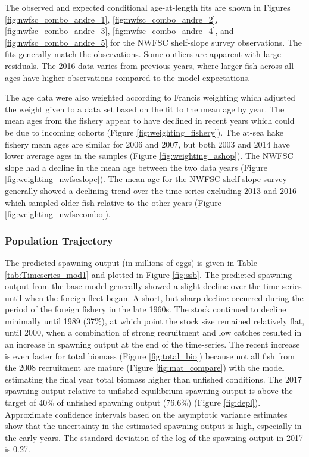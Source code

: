 \documentclass[12pt,]{article}
\begin{document}
The observed and expected conditional age-at-length fits are shown in
Figures \ref{fig:nwfsc_combo_andre_1}, \ref{fig:nwfsc_combo_andre_2},
\ref{fig:nwfsc_combo_andre_3}, \ref{fig:nwfsc_combo_andre_4}, and
\ref{fig:nwfsc_combo_andre_5} for the NWFSC shelf-slope survey
observations. The fits generally match the observations. Some outliers
are apparent with large residuals. The 2016 data varies from previous
years, where larger fish across all ages have higher observations
compared to the model expectations.

The age data were also weighted according to Francis weighting which
adjusted the weight given to a data set based on the fit to the mean age
by year. The mean ages from the fishery appear to have declined in
recent years which could be due to incoming cohorts (Figure
\ref{fig:weighting_fishery}). The at-sea hake fishery mean ages are
similar for 2006 and 2007, but both 2003 and 2014 have lower average
ages in the samples (Figure \ref{fig:weighting_ashop}). The NWFSC slope
had a decline in the mean age between the two data years (Figure
\ref{fig:weighting_nwfscslope}). The mean age for the NWFSC shelf-slope
survey generally showed a declining trend over the time-series excluding
2013 and 2016 which sampled older fish relative to the other years
(Figure \ref{fig:weighting_nwfsccombo}).

\subsubsection{Population Trajectory}\label{population-trajectory}

The predicted spawning output (in millions of eggs) is given in Table
\ref{tab:Timeseries_mod1} and plotted in Figure \ref{fig:ssb}. The
predicted spawning output from the base model generally showed a slight
decline over the time-series until when the foreign fleet began. A
short, but sharp decline occurred during the period of the foreign
fishery in the late 1960s. The stock continued to decline minimally
until 1989 (37\%), at which point the stock size remained relatively
flat, until 2000, when a combination of strong recruitment and low
catches resulted in an increase in spawning output at the end of the
time-series. The recent increase is even faster for total biomass
(Figure \ref{fig:total_bio}) because not all fish from the 2008
recruitment are mature (Figure \ref{fig:mat_compare}) with the model
estimating the final year total biomass higher than unfished conditions.
The 2017 spawning output relative to unfished equilibrium spawning
output is above the target of 40\% of unfished spawning output (76.6\%)
(Figure \ref{fig:depl}). Approximate confidence intervals based on the
asymptotic variance estimates show that the uncertainty in the estimated
spawning output is high, especially in the early years. The standard
deviation of the log of the spawning output in 2017 is 0.27.
\end{document}
